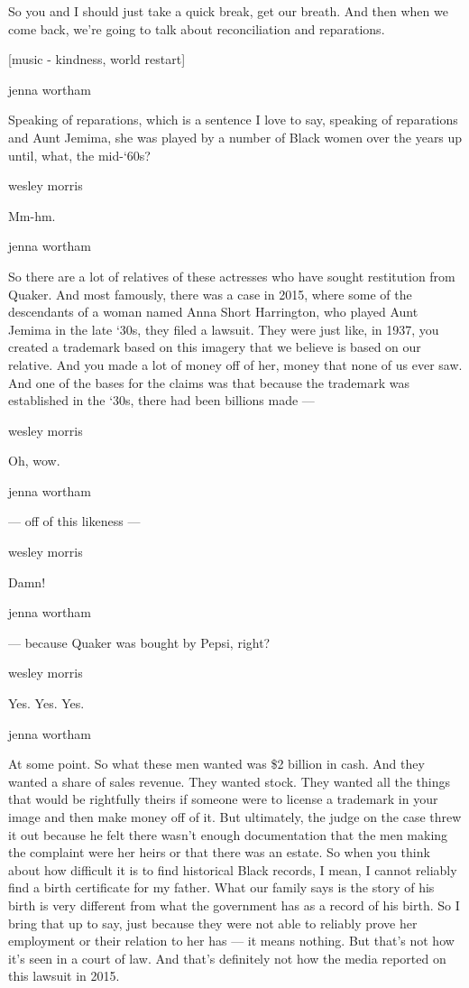 So you and I should just take a quick break, get our breath. And then
when we come back, we're going to talk about reconciliation and
reparations.

{[}music - kindness, world restart{]}

jenna wortham

Speaking of reparations, which is a sentence I love to say, speaking of
reparations and Aunt Jemima, she was played by a number of Black women
over the years up until, what, the mid-`60s?

wesley morris

Mm-hm.

jenna wortham

So there are a lot of relatives of these actresses who have sought
restitution from Quaker. And most famously, there was a case in 2015,
where some of the descendants of a woman named Anna Short Harrington,
who played Aunt Jemima in the late `30s, they filed a lawsuit. They were
just like, in 1937, you created a trademark based on this imagery that
we believe is based on our relative. And you made a lot of money off of
her, money that none of us ever saw. And one of the bases for the claims
was that because the trademark was established in the `30s, there had
been billions made ---

wesley morris

Oh, wow.

jenna wortham

--- off of this likeness ---

wesley morris

Damn!

jenna wortham

--- because Quaker was bought by Pepsi, right?

wesley morris

Yes. Yes. Yes.

jenna wortham

At some point. So what these men wanted was \$2 billion in cash. And
they wanted a share of sales revenue. They wanted stock. They wanted all
the things that would be rightfully theirs if someone were to license a
trademark in your image and then make money off of it. But ultimately,
the judge on the case threw it out because he felt there wasn't enough
documentation that the men making the complaint were her heirs or that
there was an estate. So when you think about how difficult it is to find
historical Black records, I mean, I cannot reliably find a birth
certificate for my father. What our family says is the story of his
birth is very different from what the government has as a record of his
birth. So I bring that up to say, just because they were not able to
reliably prove her employment or their relation to her has --- it means
nothing. But that's not how it's seen in a court of law. And that's
definitely not how the media reported on this lawsuit in 2015.

